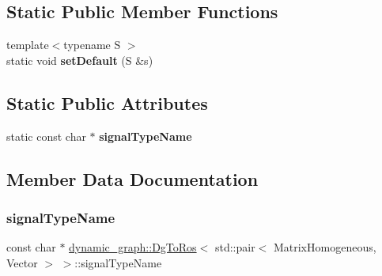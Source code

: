 \subsection*{Static Public Member Functions}
\begin{DoxyCompactItemize}
\item 
\mbox{\label{structdynamic__graph_1_1DgToRos_3_01std_1_1pair_3_01MatrixHomogeneous_00_01Vector_01_4_01_4_ab5d21c1a813043c42b1444084d2001b5}} 
{\footnotesize template$<$typename S $>$ }\\static void {\bfseries set\+Default} (S \&s)
\end{DoxyCompactItemize}
\subsection*{Static Public Attributes}
\begin{DoxyCompactItemize}
\item 
static const char $\ast$ {\bfseries signal\+Type\+Name}
\end{DoxyCompactItemize}


\subsection{Member Data Documentation}
\mbox{\label{structdynamic__graph_1_1DgToRos_3_01std_1_1pair_3_01MatrixHomogeneous_00_01Vector_01_4_01_4_a1d5bcd8801ebb4c87d4870ed195f01c2}} 
\subsubsection{\texorpdfstring{signal\+Type\+Name}{signalTypeName}}
{\footnotesize\ttfamily const char $\ast$ \hyperlink{classdynamic__graph_1_1DgToRos}{dynamic\+\_\+graph\+::\+Dg\+To\+Ros}$<$ std\+::pair$<$ Matrix\+Homogeneous, Vector $>$ $>$\+::signal\+Type\+Name\hspace{0.3cm}{\ttfamily [static]}}

